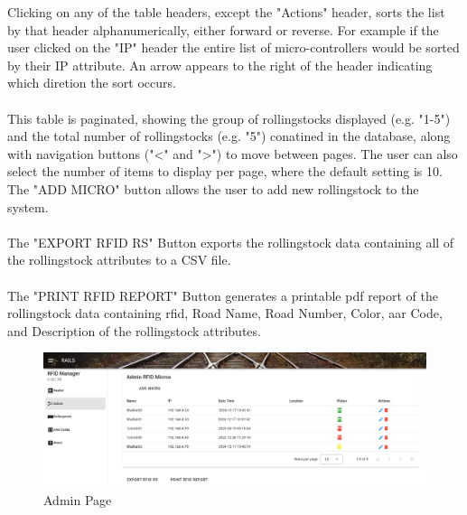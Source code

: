 Clicking on any of the table headers, except the "Actions" header, sorts the list by that header alphanumerically, either forward or reverse. For example 
if the user clicked on the "IP" header the entire list of micro-controllers would be sorted by their IP attribute. An arrow appears to the right of the 
header indicating which diretion the sort occurs.\\
\\
This table is paginated, showing the group of rollingstocks displayed (e.g. "1-5") and the total number of rollingstocks (e.g. "5") conatined in the database, along 
with navigation buttons ("<" and ">") to move between pages. The user can also select the number of items to display per page, where the default setting is 10.
The "ADD MICRO" button allows the user to add new rollingstock to the system.\\
\\
The "EXPORT RFID RS" Button exports the rollingstock data containing all of the rollingstock attributes to a CSV file.\\
\\
The "PRINT RFID REPORT" Button generates a printable \gls{pdf} report of the rollingstock data containing \gls{rfid}, Road Name, Road Number, Color, \gls{aar} Code, 
and Description of the rollingstock attributes.

\begin{figure}[H]
    \centering
    \includegraphics[scale=0.33]{./images/admin.png}
    \caption{Admin Page}
    \label{fig:admin1}
\end{figure}

